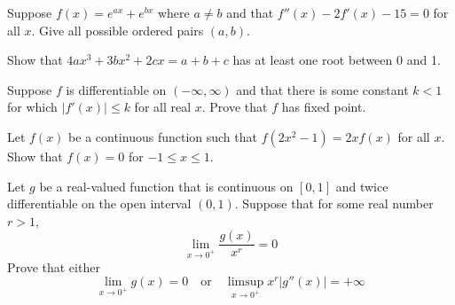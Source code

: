 \documentclass{article}
\begin{document}
\begin{exercise}
            Suppose \(f(x) = e^{ax} + e^{bx}\) where \(a\neq b\) and that \(f''(x)-2f'(x)-15=0\) for all \(x\).
            Give all possible ordered pairs \((a,b)\).
        \end{exercise}

        \begin{exercise}
            Show that $4ax^3 + 3bx^2 + 2cx = a + b + c$ has at least one root between 0 and 1.
        \end{exercise}

\begin{exercise}
           Suppose $f$ is differentiable on $(-\infty, \infty)$ and that there is some constant $k<1$ for which $|f'(x)|\leq k$ for all real $x$. Prove that $f$ has fixed point. 
\end{exercise}

\begin{exercise}[2000 B4]
    Let $f(x)$ be a continuous function such that $f(2x^{2} - 1) = 2xf(x)$ for all $x$. Show that $f(x) = 0$ for $-1 \leq x \leq 1$. 
\end{exercise}

\begin{exercise}[2019 A6]
Let $g$ be a real-valued function that is continuous on $[0,1]$ and twice differentiable on the open interval $(0,1)$. Suppose that for some real number $r>1$, 
\[\lim_{x\to 0^+} \frac{g(x)}{x^r}=0\] Prove that either 
\[\lim_{x\to 0^+} g(x)=0\quad\textrm{or}\quad\limsup_{x\to 0^+}x^r|g''(x)| = +\infty\]
\end{exercise}
\end{document}
